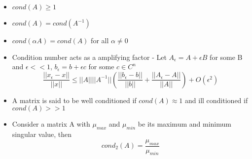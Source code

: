 \documentclass{article}
\begin{document}
	\begin{itemize}
		\item $cond(A) \geq 1$
		\item $cond(A)= cond(A^{-1})$
		\item $cond(\alpha A) = cond(A)$ for all $\alpha \neq 0$\\


		\item Condition number acts as a amplifying factor - Let $A_\epsilon = A + \epsilon B$ for some B and $\epsilon << 1$, $b_\epsilon = b + \epsilon c$ for some $c\in C^n$
			\[\frac{||x_\epsilon - x||}{||x||} \leq ||A|| ||A^{-1}|| \left( \frac{||b_\epsilon - b||}{||b||} + \frac{||A_\epsilon - A||}{||A||}  \right) + O(\epsilon^2) \]

		\item A matrix is said to be well conditioned if $cond(A) \approx 1$ and ill conditioned if $cond(A) >>1$

		\item Consider a matrix A with $\mu_{max}$ and $\mu_{min}$ be its maximum and minimum singular value, then
			\[cond_2(A) = \frac{\mu_{max}}{\mu_{min}}\]

	\end{itemize}
\end{document}
